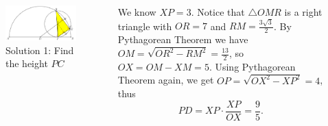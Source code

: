 \documentclass[professionalfont, 12pt, handout, t]{beamer} %
\theoremstyle{plain}
\theoremstyle{definition}
\begin{document}
\begin{frame}{}
    \begin{columns}    
        \begin{figure}[h]
            \centering
            \includegraphics[scale=0.3]{Geometry Solution 1.PNG}
            \captionsetup{labelformat=empty}
            \caption{Solution 1: Find the height $PC$}
        \end{figure}

        We know $XP = 3$.
        Notice that $\triangle OMR$ is a right triangle with $OR = 7$ and $\displaystyle RM = \frac{3\sqrt{3}}{2}$.
        By Pythagorean Theorem we have $\displaystyle OM = \sqrt{OR^2-RM^2} = \frac{13}{2}$, so $OX = OM-XM = 5$.
        \pause
        Using Pythagorean Theorem again, we get $\displaystyle OP = \sqrt{OX^2-XP^2} = 4$, thus
        \[
            PD = XP \cdot \frac{XP}{OX} = \frac{9}{5}.
        \]
    \end{columns}
\end{frame}
\end{document}
